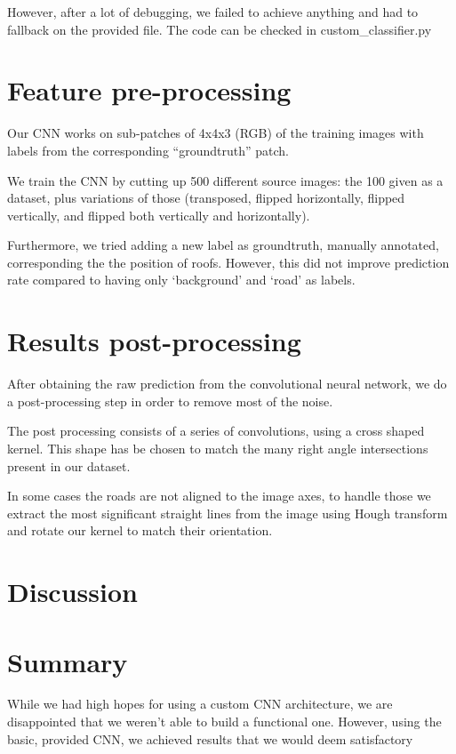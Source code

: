 \documentclass[11pt,conference,compsocconf]{IEEEtran}
\begin{document}
However, after a lot of debugging, we failed to achieve anything and had to fallback on the provided file. The code can be checked in custom\_classifier.py

\section{Feature pre-processing}

Our CNN works on sub-patches of 4x4x3 (RGB) of the training images with labels from the corresponding ``groundtruth'' patch.

We train the CNN by cutting up 500 different source images: the 100 given as a dataset, plus variations of those (transposed, flipped horizontally, flipped vertically, and flipped both vertically and horizontally).

Furthermore, we tried adding a new label as groundtruth, manually annotated, corresponding the the position of roofs. However, this did not improve prediction rate compared to having only `background' and `road' as labels.


\section{Results post-processing}
After obtaining the raw prediction from the convolutional neural network, we do a post-processing step in order to remove most of the noise.

The post processing consists of a series of convolutions, using a cross shaped kernel. This shape has be chosen to match the many right angle intersections present in our dataset.

In some cases the roads are not aligned to the image axes, to handle those we extract the most significant straight lines from the image using Hough transform and rotate our kernel to match their orientation.


\section{Discussion}


\section{Summary}
While we had high hopes for using a custom CNN architecture, we are disappointed that we weren't able to build a functional one. However, using the basic, provided CNN, we achieved results that we would deem satisfactory
\end{document}
